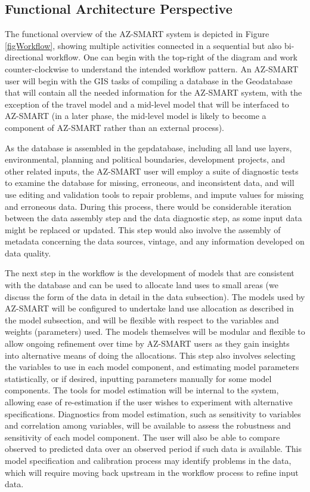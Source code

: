 \subsection{Functional Architecture Perspective}
The functional overview of the AZ-SMART system is depicted in Figure \ref{figWorkflow}, showing multiple activities connected in a sequential but also bi-directional workflow.  One can begin with the top-right of the diagram and work counter-clockwise to understand the intended workflow pattern.  An AZ-SMART user will begin with the GIS tasks of compiling a database in the Geodatabase that will contain all the needed information for the AZ-SMART system, with the exception of the travel model and a mid-level model that will be interfaced to AZ-SMART (in a later phase, the mid-level model is likely to become a component of AZ-SMART rather than an external process). 

As the database is assembled in the gepdatabase, including all land use layers, environmental, planning and political boundaries, development projects, and other related inputs, the AZ-SMART user will employ a suite of diagnostic tests to examine the database for missing, erroneous, and inconsistent data, and will use editing and validation tools to repair problems, and impute values for missing and erroneous data.  During this process, there would be considerable iteration between the data assembly step and the data diagnostic step, as some input data might be replaced or updated.  This step would also involve the assembly of metadata concerning the data sources, vintage, and any information developed on data quality.

The next step in the workflow is the development of models that are consistent with the database and can be used to allocate land uses to small areas (we discuss the form of the data in detail in the data subsection).  The models used by AZ-SMART will be configured to undertake land use allocation as described in the model subsection, and will be flexible with respect to the variables and weights (parameters) used.  The models themselves will be modular and flexible to allow ongoing refinement over time by AZ-SMART users as they gain insights into alternative means of doing the allocations.  This step also involves selecting the variables to use in each model component, and estimating model parameters statistically, or if desired, inputting parameters manually for some model components.  The tools for model estimation will be internal to the system, allowing ease of re-estimation if the user wishes to experiment with alternative specifications.  Diagnostics from model estimation, such as sensitivity to variables and correlation among variables, will be available to assess the robustness and sensitivity of each model component.  The user will also be able to compare observed to predicted data over an observed period if such data is available.  This model specification and calibration process may identify problems in the data, which will require moving back upstream in the workflow process to refine input data.

